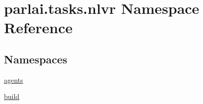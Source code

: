 \hypertarget{namespaceparlai_1_1tasks_1_1nlvr}{}\section{parlai.\+tasks.\+nlvr Namespace Reference}
\label{namespaceparlai_1_1tasks_1_1nlvr}
\subsection*{Namespaces}
\begin{DoxyCompactItemize}
\item 
 \hyperlink{namespaceparlai_1_1tasks_1_1nlvr_1_1agents}{agents}
\item 
 \hyperlink{namespaceparlai_1_1tasks_1_1nlvr_1_1build}{build}
\end{DoxyCompactItemize}
